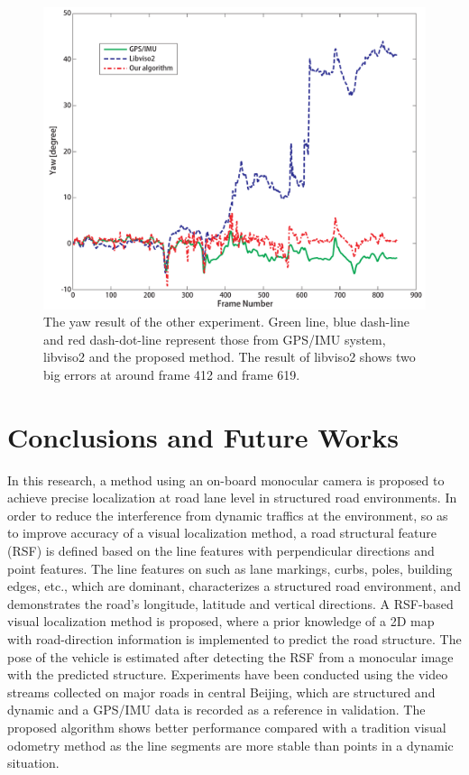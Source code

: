 \documentclass[letterpaper, 10 pt, conference]{ieeeconf}  %
\begin{document}
\begin{figure}[t]
\centering
\includegraphics[width=0.9\linewidth]{source//Final//R_result_Frame200_1049.pdf}
\caption{The yaw result of the other experiment. Green line, blue dash-line and red dash-dot-line represent those from GPS/IMU system, libviso2 and the proposed method. The result of libviso2 shows two big errors at around frame 412 and frame 619.}
\label{fig:another_rotation_result}
\end{figure}

\section{Conclusions and Future Works}
\label{sec_conclusion}

In this research, a method using an on-board monocular camera is proposed to achieve precise localization at road lane level in structured road environments. In order to reduce the interference from dynamic traffics at the environment, so as to improve accuracy of a visual localization method, a road structural feature (RSF) is defined based on the line features with perpendicular directions and point features. The line features on such as lane markings, curbs, poles, building edges, etc., which are dominant, characterizes a structured road environment, and demonstrates the road's longitude, latitude and vertical directions.
A RSF-based visual localization method is proposed, where a prior knowledge of a 2D map with road-direction information is implemented to predict the road structure. The pose of the vehicle is estimated after detecting the RSF from a monocular image with the predicted structure.
Experiments have been conducted using the video streams collected on major roads in central Beijing, which are structured and dynamic and a GPS/IMU data is recorded as a reference in validation.
The proposed algorithm shows better performance compared with a tradition visual odometry method as the line segments are more stable than points in a dynamic situation.
\end{document}
